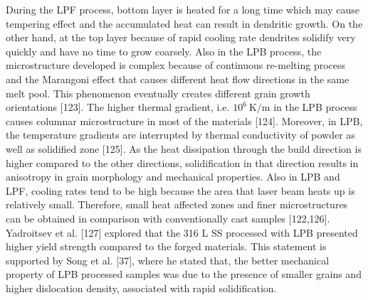 \documentclass[10pt]{article}
\begin{document}
During the LPF process, bottom layer is heated for a long time which may cause tempering effect and the accumulated heat can result in dendritic growth. On the other hand, at the top layer because of rapid cooling rate dendrites solidify very quickly and have no time to grow coarsely. Also in the LPB process, the microstructure developed is complex because of continuous re-melting process and the Marangoni effect that causes different heat flow directions in the same melt pool. This phenomenon eventually creates different grain growth orientations [123]. The higher thermal gradient, i.e. $10^{6} \mathrm{~K} / \mathrm{m}$ in the LPB process causes columnar microstructure in most of the materials [124]. Moreover, in LPB, the temperature gradients are interrupted by thermal conductivity of powder as well as solidified zone [125]. As the heat dissipation through the build direction is higher compared to the other directions, solidification in that direction results in anisotropy in grain morphology and mechanical properties. Also in LPB and LPF, cooling rates tend to be high because the area that laser beam heats up is relatively small. Therefore, small heat affected zones and finer microstructures can be obtained in comparison with conventionally cast samples [122,126]. Yadroitsev et al. [127] explored that the 316 L SS processed with LPB presented higher yield strength compared to the forged materials. This statement is supported by Song et al. [37], where he stated that, the better mechanical property of LPB processed samples was due to the presence of smaller grains and higher dislocation density, associated with rapid solidification.
\end{document}
